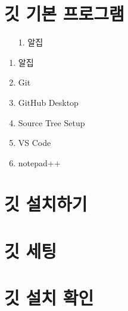 \documentclass[12pt, a4paper, oneside]{book}
\let\stdsection\section
\renewcommand\section{\newpage\stdsection}
\begin{document}
%	
	\section 	{깃 기본 프로그램}




			\begin{itemize}	[
						topsep=0.0em, 
						parsep=0.0em, 
						itemsep=0em, 
						leftmargin=12.0em, 
						labelwidth=3em, 
						labelsep=3em
						] 
			\item [1.] 	알집 
			\end{itemize}


				\begin{enumerate}
				\setlength\itemsep{-1.0em}
				\item	알집
				\item	Git
				\item	GitHub Desktop
				\item	Source Tree Setup
				\item	VS Code
				\item	notepad++
				\end{enumerate}


%	
	\section 	{깃 설치하기}


%	
	\section 	{깃 세팅}

%	
	\section 	{깃 설치 확인}
\end{document}
